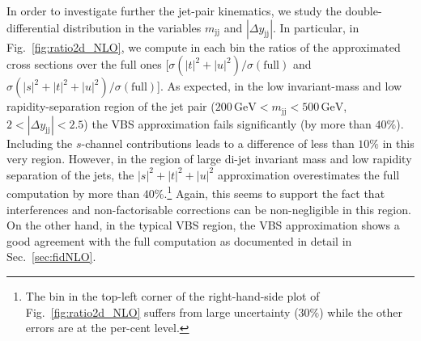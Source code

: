 \documentclass[twocolumn,epjc3]{svjour3} %
\newcommand{\Pj}{\ensuremath{\text{j}}\xspace}
\newcommand{\GeV}{\ensuremath{\,\text{GeV}}\xspace}
\begin{document}
    In order to investigate further the jet-pair kinematics, we study the double-differential distribution in the variables $m_{\Pj\Pj}$ and $|\Delta y_{\Pj\Pj}|$.
    In particular, in Fig.~\ref{fig:ratio2d_NLO}, we compute in each bin the ratios of the approximated cross sections over the full ones [$\sigma(|t|^2+|u|^2)/\sigma(\textrm{full})$ and $\sigma(|s|^2+|t|^2+|u|^2)/\sigma(\textrm{full})$].
    As expected, in the low invariant-mass and low rapidity-separation region of the jet pair ($200 \GeV < m_{\Pj\Pj} < 500 \GeV$, $2<|\Delta y_{\Pj\Pj}|<2.5$) the VBS approximation fails significantly (by more than $40\%$).
    Including the $s$-channel contributions leads to a difference of less than $10\%$ in this very region.
    However, in the region of large di-jet invariant mass and low rapidity separation of the jets, the $|s|^2+|t|^2+|u|^2$ approximation overestimates the full computation by more than $40\%$.\footnote{The bin
    in the top-left corner of the right-hand-side plot of Fig.~\ref{fig:ratio2d_NLO} suffers from large uncertainty ($30\%$) while the other errors are at the per-cent level.}
    Again, this seems to support the fact that interferences and non-factorisable corrections can be non-negligible in this region.
    On the other hand, in the typical VBS region, the VBS approximation shows a good agreement with the full computation as documented in detail in Sec.~\ref{sec:fidNLO}.
\end{document}

